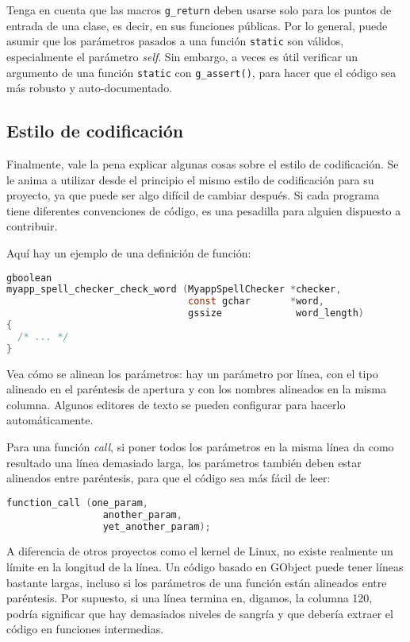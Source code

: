 Tenga en cuenta que las macros \lstinline{g_return} deben usarse solo para los puntos de entrada de una clase, es decir, en sus funciones públicas. Por lo general, puede asumir que los parámetros pasados a una función \lstinline{static} son válidos, especialmente el parámetro \emph{self}. Sin embargo, a veces es útil verificar un argumento de una función \lstinline{static} con \lstinline{g_assert()}, para hacer que el código sea más robusto y auto-documentado.

\subsection{Estilo de codificación}
Finalmente, vale la pena explicar algunas cosas sobre el estilo de codificación. Se le anima a utilizar desde el principio el mismo estilo de codificación para su proyecto, ya que puede ser algo difícil de cambiar después. Si cada programa tiene diferentes convenciones de código, es una pesadilla para alguien dispuesto a contribuir.

Aquí hay un ejemplo de una definición de función:

\begin{lstlisting}[language=C]
gboolean
myapp_spell_checker_check_word (MyappSpellChecker *checker,
                                const gchar       *word,
                                gssize             word_length)
{
  /* ... */
}
\end{lstlisting}

Vea cómo se alinean los parámetros: hay un parámetro por línea, con el tipo alineado en el paréntesis de apertura y con los nombres alineados en la misma columna. Algunos editores de texto se pueden configurar para hacerlo automáticamente.

Para una función \emph{call}, si poner todos los parámetros en la misma línea da como resultado una línea demasiado larga, los parámetros también deben estar alineados entre paréntesis, para que el código sea más fácil de leer:

\begin{lstlisting}[language=C]
  function_call (one_param,
                 another_param,
                 yet_another_param);
\end{lstlisting}

A diferencia de otros proyectos como el kernel de Linux, no existe realmente un límite en la longitud de la línea. Un código basado en GObject puede tener líneas bastante largas, incluso si los parámetros de una función están alineados entre paréntesis. Por supuesto, si una línea termina en, digamos, la columna 120, podría significar que hay demasiados niveles de sangría y que debería extraer el código en funciones intermedias.

